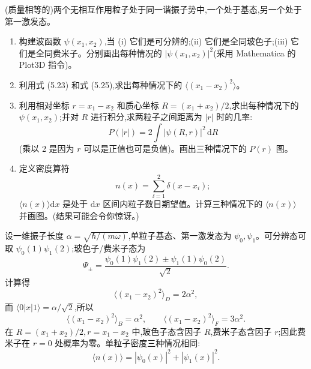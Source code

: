 \begin{question}
(质量相等的)两个无相互作用粒子处于同一谐振子势中,一个处于基态,另一个处于第一激发态。
\begin{enumerate}
\item 构建波函数 $\psi(x_1,x_2)$,当 (i) 它们是可分辨的;(ii) 它们是全同玻色子;(iii) 它们是全同费米子。分别画出每种情况的 $|\psi(x_1,x_2)|^2$(采用 Mathematica 的 Plot3D 指令)。
\item 利用式 (5.23) 和式 (5.25),求出每种情况下的 $\langle (x_1-x_2)^2\rangle$。
\item 利用相对坐标 $r=x_1-x_2$ 和质心坐标 $R=(x_1+x_2)/2$,求出每种情况下的 $\psi(x_1,x_2)$;并对 $R$ 进行积分,求两粒子之间距离为 $|r|$ 时的几率:
\[
P(|r|)=2\int |\psi(R,r)|^2\,\mathrm dR
\]
(乘以 2 是因为 $r$ 可以是正值也可是负值)。画出三种情况下的 $P(r)$ 图。
\item 定义密度算符
\[
n(x)=\sum_{\ii=1}^{2}\delta(x-x_i);
\]
$\langle n(x)\rangle\mathrm dx$ 是处于 $\mathrm dx$ 区间内粒子数目期望值。计算三种情况下的 $\langle n(x)\rangle$ 并画图。(结果可能会令你惊讶。)
\end{enumerate}

\par\smallskip
{}

\end{question}
\begin{solution}

设一维振子长度 $\alpha=\sqrt{\hbar/(m\omega)}$,单粒子基态、第一激发态为 $\psi_0,\psi_1$。可分辨态可取 $\psi_0(1)\psi_1(2)$;玻色子/费米子态为
\[
\Psi_\pm=\frac{\psi_0(1)\psi_1(2)\pm\psi_1(1)\psi_0(2)}{\sqrt2}.
\]
计算得
\[
\langle(x_1-x_2)^2\rangle_D=2\alpha^2,
\]
而 $\langle0|x|1\rangle=\alpha/\sqrt2$,所以
\[
\langle(x_1-x_2)^2\rangle_B=\alpha^2,
\qquad
\langle(x_1-x_2)^2\rangle_F=3\alpha^2.
\]
在 $R=(x_1+x_2)/2,r=x_1-x_2$ 中,玻色子态含因子 $R$,费米子态含因子 $r$;因此费米子在 $r=0$ 处概率为零。单粒子密度三种情况相同:
\[
\langle n(x)\rangle=|\psi_0(x)|^2+|\psi_1(x)|^2.
\]

\end{solution}

